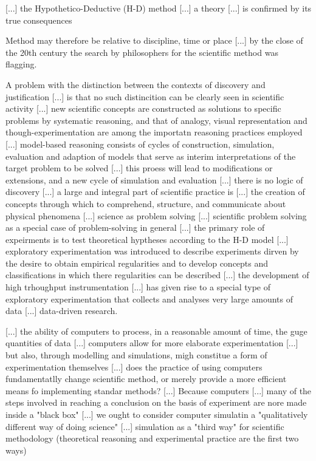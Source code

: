 {\color{red} [...] the Hypothetico-Deductive (H-D) method [...] a theory [...] is confirmed by its true consequences}

{\color{red} Method may therefore be relative to discipline, time or place [...] by the close of the 20th century the search by philosophers for the scientific method was flagging.}

{\color{red} A problem with the distinction between the contexts of discovery and justification [...] is that no such distincition can be clearly seen in scientific activity [...] new scientific concepts are constructed as solutions to specific problems by systematic reasoning, and that of analogy, visual representation and though-experimentation are among the importatn reasoning practices employed [...] model-based reasoning consists of cycles of construction, simulation, evaluation and adaption of models that serve as interim interpretations of the target problem to be solved [...] this proess will lead to modifications or extensions, and a new cycle of simulation and evaluation [...] there is no logic of discovery [...] a large and integral part of scientific practice is [...] the creation of concepts through which to comprehend, structure, and communicate about physical phenomena [...] science as problem solving [...] scientific problem solving as a special case of problem-solving in general [...] the primary role of expeirments is to test theoretical hyptheses according to the H-D model [...] exploratory experimentation was introduced to describe experiments dirven by the desire to obtain empirical regularities and to develop concepts and classifications in which there regularities can be described [...] the development of high trhoughput instrumentation [...] has given rise to a special type of exploratory experimentation that collects and analyses very large amounts of data [...] data-driven research.}

{\color{red} [...] the ability of computers to process, in a reasonable amount of time, the guge quantities of data [...] computers allow for more elaborate experimentation [...] but also, through modelling and simulations, migh constitue a form of experimentation themselves [...] does the practice of using computers fundamentatlly change scientific method, or merely provide a more efficient means fo implementing standar methods? [...] Because computers [...] many of the steps involved in reaching a conclusion on the basis of experiment are nore made inside a "black box" [...] we ought to consider computer simulatin a "qualitatively different way of doing science" [...] simulation as a "third way" for scientific methodology (theoretical reasoning and experimental practice are the first two ways)}

